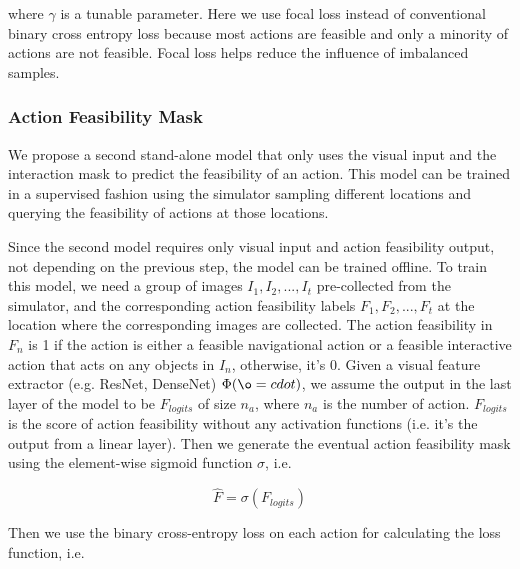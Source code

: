 \documentclass[11pt,a4paper]{article}
\begin{document}
where $\gamma$ is a tunable parameter. Here we use focal loss instead of conventional binary cross entropy loss because most actions are feasible and only a minority of actions are not feasible. Focal loss helps reduce the influence of imbalanced samples.



\subsubsection{Action Feasibility Mask}
We propose a second stand-alone model that only uses the visual input and the interaction mask to predict the feasibility of an action. This model can be trained in a supervised fashion using the simulator sampling different locations and querying the feasibility of actions at those locations. 

Since the second model requires only visual input and action feasibility output, not depending on the previous step, the model can be trained offline. To train this model, we need a group of images ${I_1, I_2, ..., I_t}$ pre-collected from the simulator, and the corresponding action feasibility labels ${F_1, F_2, ..., F_t}$ at the location where the corresponding images are collected. The action feasibility in $F_n$ is 1 if the action is either a feasible navigational action or a feasible interactive action that acts on any objects in $I_n$, otherwise, it's 0. Given a visual feature extractor (e.g. ResNet, DenseNet) $\Phi(\o=cdot)$, we assume the output in the last layer of the model to be $F_{logits}$ of size $n_a$, where $n_a$ is the number of action. $F_{logits}$ is the score of action feasibility without any activation functions (i.e. it's the output from a linear layer). Then we generate the eventual action feasibility mask using the element-wise sigmoid function $\sigma$, i.e.

\begin{equation}
    \hat{F} = \sigma(F_{logits})
\end{equation}

Then we use the binary cross-entropy loss on each action for calculating the loss function, i.e. 
\end{document}
